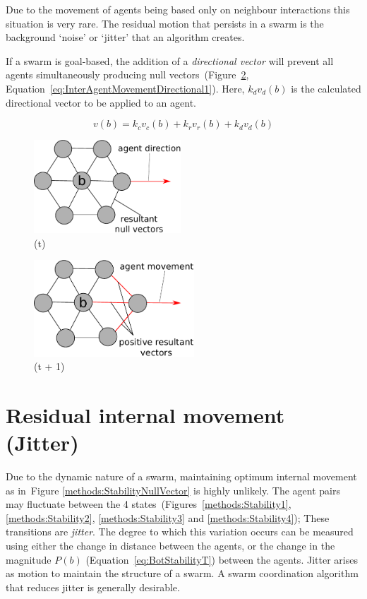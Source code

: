 \documentclass{ieeeaccess}
\begin{document}
Due to the movement of agents being based only on neighbour interactions this situation is very rare. The residual motion that persists in a swarm is the background `noise' or `jitter' that an algorithm creates.

If a swarm is goal-based, the addition of a \emph{directional vector} will prevent all agents simultaneously producing null vectors~(Figure~\ref{concave:VoidPerimeter2}, Equation~\ref{eq:InterAgentMovementDirectional1}). Here, $k_dv_{d}(b)$ is the calculated directional vector to be applied to an agent.

\begin{equation}\label{eq:InterAgentMovementDirectional1}
v(b) = k_cv_{c}(b) + k_rv_{r}(b) + k_dv_{d}(b)
\end{equation}

\begin{figure}[H]
\begin{center}
	 \includegraphics[width=5.5cm]{figures/StabilityNullVector3}
\end{center}
\label{concave:VoidPerimeter1}
\caption{(t)}
\end{figure}

\begin{figure}[H]
\begin{center}
	 \includegraphics[width=6cm]{figures/StabilityNullVector2}
\end{center}
\caption{(t + 1)}
\label{concave:VoidPerimeter2}
\end{figure}

\section{Residual internal movement (Jitter)}\label{metric:Jitter}
Due to the dynamic nature of a swarm, maintaining optimum internal movement as in~Figure \ref{methods:StabilityNullVector} is highly unlikely. The agent pairs may fluctuate between the 4 states~(Figures~\ref{methods:Stability1}, \ref{methods:Stability2}, \ref{methods:Stability3} and \ref{methods:Stability4}); These transitions are \emph{jitter}. The degree to which this variation occurs can be measured using either the change in distance between the agents, or the change in the magnitude $P(b)$ (Equation~\ref{eq:BotStabilityT}) between the agents. Jitter arises as motion to maintain the structure of a swarm. A swarm coordination algorithm that reduces jitter is generally desirable. 
\end{document}
